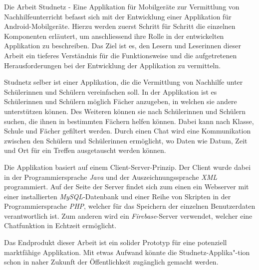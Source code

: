 \documentclass[../main.tex]{subfiles}
\begin{document}
	
	Die Arbeit \glqq Studnetz - Eine Applikation für Mobilgeräte zur Vermittlung von Nachhilfeunterricht\grqq{} befasst sich mit der Entwicklung einer Applikation für Android-Mobilgeräte. Hierzu werden zuerst Schritt für Schritt die einzelnen Komponenten erläutert, um anschliessend ihre Rolle in der entwickelten Applikation zu beschreiben. Das Ziel ist es, den Lesern und Leserinnen dieser Arbeit ein tieferes Verständnis für die Funktionsweise und die aufgetretenen Herausforderungen bei der Entwicklung der Applikation zu vermitteln.
	
	Studnetz selber ist einer Applikation, die die Vermittlung von Nachhilfe unter Schülerinnen und Schülern vereinfachen soll. In der Applikation ist es Schülerinnen und Schülern möglich Fächer anzugeben, in welchen sie andere unterstützen können. Des Weiteren können sie nach Schülerinnen und Schülern suchen, die ihnen in bestimmten Fächern helfen können. Dabei kann nach Klasse, Schule und Fächer gefiltert werden. Durch einen Chat wird eine Kommunikation zwischen den Schülern und Schülerinnen ermöglicht, wo Daten wie Datum, Zeit und Ort für ein Treffen ausgetauscht werden können.
	
	Die Applikation basiert auf einem Client-Server-Prinzip. Der Client wurde dabei in der Programmiersprache \emph{Java} und der Auszeichnungssprache \emph{XML} programmiert. Auf der Seite der Server findet sich zum einen ein Webserver mit einer installierten \emph{MySQL}-Datenbank und einer Reihe von Skripten in der Programmiersprache \emph{PHP}, welcher für das Speichern der einzelnen Benutzerdaten verantwortlich ist. Zum anderen wird ein \emph{Firebase}-Server verwendet, welcher eine Chatfunktion in Echtzeit ermöglicht.
	
	Das Endprodukt dieser Arbeit ist ein solider Prototyp für eine potenziell marktfähige Applikation. Mit etwas Aufwand könnte die Studnetz-Applika"-tion schon in naher Zukunft der Öffentlichkeit zugänglich gemacht werden.
	
\end{document}
